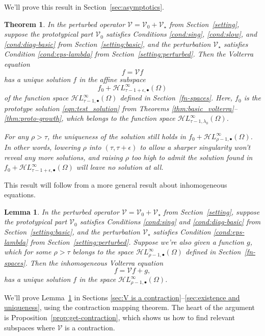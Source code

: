 \documentclass{article}
\theoremstyle{plain}
\newtheorem{lemma}{Lemma}
\newtheorem{thm}{Theorem}
\newcommand{\singexp}[2]{\mathcal{H}L^\infty_{#1, #2}}
\newcommand{\singexpalg}[1]{\singexp{#1}{\bullet}}
\newcommand{\volterra}{\mathcal{V}}
\newcommand{\hardpart}{\mathcal{V}_0}
\newcommand{\softpart}{\mathcal{V}_\star}
\begin{document}
We'll prove this result in Section~\ref{sec:asymptotics}.
\begin{thm}\label{thm:general_volterra}
In the perturbed operator $\volterra = \hardpart +\softpart$ from Section~\ref{setting}, suppose the prototypical part $\hardpart$ satisfies {\em Conditions \eqref{cond:sing}}, \eqref{cond:slow}, and \eqref{cond:diag-basic} from Section~\ref{setting:basic}, and the perturbation $\softpart$ satisfies Condition \eqref{cond:eps-lambda} from Section~\ref{setting:perturbed}. Then the Volterra equation
\[f = \volterra f\]
has a unique solution $f$ in the affine subspace
\[ f_0 + \singexpalg{\tau-1+\epsilon}(\Omega) \]
of the function space $\singexpalg{\tau-1}(\Omega)$ defined in Section~\ref{fn-spaces}. Here, $f_0$ is the prototype solution \eqref{eqn:test_solution} from Theorems \ref{thm:basic_volterra}--\ref{thm:proto-growth}, which belongs to the function space $\singexp{\tau-1}{\lambda_0}(\Omega)$.

For any $\rho > \tau$, the uniqueness of the solution still holds in $f_0 + \singexpalg{\rho-1}(\Omega)$. In other words, lowering $\rho$ into $(\tau, \tau+\epsilon)$ to allow a sharper singularity won't reveal any more solutions, and raising $\rho$ too high to admit the solution found in $f_0 + \singexpalg{\tau-1+\epsilon}(\Omega)$ will leave no solution at all.
\end{thm}
This result will follow from a more general result about inhomogeneous equations.
\begin{lemma}\label{lem:perturbed_volterra}
In the perturbed operator $\volterra = \hardpart +\softpart$ from Section~\ref{setting}, suppose the prototypical part $\hardpart$ satisfies {\em Conditions \eqref{cond:sing}} and \eqref{cond:diag-basic} from Section~\ref{setting:basic}, and the perturbation $\softpart$ satisfies {\em Condition \eqref{cond:eps-lambda}} from Section~\ref{setting:perturbed}. Suppose we're also given a function $g$, which for some $\rho > \tau$ belongs to the space $\singexpalg{\rho-1}(\Omega)$ defined in Section~\ref{fn-spaces}. Then the inhomogeneous Volterra equation
\[ f = \volterra f + g, \]
has a unique solution $f$ in the space $\singexpalg{\rho-1}(\Omega)$.
\end{lemma}
We'll prove Lemma~\ref{lem:perturbed_volterra} in Sections \ref{sec:V is a contraction}--\ref{sec:existence and uniqueness}, using the contraction mapping theorem. The heart of the argument is Proposition~\ref{prop:get-contraction}, which shows us how to find relevant subspaces where $\volterra$ is a contraction.
\end{document}
